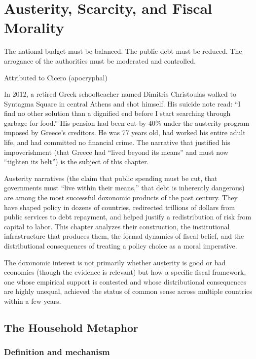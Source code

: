 \chapter{Austerity, Scarcity, and Fiscal Morality}
\label{ch:austerity}

\epigraph{The national budget must be balanced. The public debt must be reduced. The arrogance of the authorities must be moderated and controlled.}{Attributed to Cicero (apocryphal)}

\noindent
In 2012, a retired Greek schoolteacher named Dimitris Christoulas walked to Syntagma Square in central Athens and shot himself.
His suicide note read: ``I find no other solution than a dignified end before I start searching through garbage for food.''
His pension had been cut by 40\% under the austerity program imposed by Greece's creditors.
He was 77 years old, had worked his entire adult life, and had committed no financial crime.
The narrative that justified his impoverishment (that Greece had ``lived beyond its means'' and must now ``tighten its belt'') is the subject of this chapter.

Austerity narratives (the claim that public spending must be cut, that governments must ``live within their means,'' that debt is inherently dangerous) are among the most successful doxonomic products of the past century.
They have shaped policy in dozens of countries, redirected trillions of dollars from public services to debt repayment, and helped justify a redistribution of risk from capital to labor.
This chapter analyzes their construction, the institutional infrastructure that produces them, the formal dynamics of fiscal belief, and the distributional consequences of treating a policy choice as a moral imperative.

The doxonomic interest is not primarily whether austerity is good or bad economics (though the evidence is relevant) but how a specific fiscal framework, one whose empirical support is contested and whose distributional consequences are highly unequal, achieved the status of common sense across multiple countries within a few years.

\section{The Household Metaphor}
\label{sec:ch25-household}

\subsection{Definition and mechanism}

